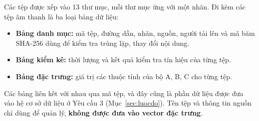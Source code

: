 \documentclass[11pt,a4paper]{article}
\begin{document}
Các tệp được xếp vào 13 thư mục, mỗi thư mục ứng với một nhãn. Đi kèm các tệp âm thanh là ba loại bảng dữ liệu:
\begin{itemize}
\item \textbf{Bảng danh mục:} mã tệp, đường dẫn, nhãn, nguồn, người tải lên và mã băm SHA-256 dùng để kiểm tra trùng lặp, thay đổi nội dung.
\item \textbf{Bảng kiểm kê:} thời lượng và kết quả kiểm tra tín hiệu của từng tệp.
\item \textbf{Bảng đặc trưng:} giá trị các thuộc tính của bộ A, B, C cho từng tệp.
\end{itemize}
Các bảng liên kết với nhau qua mã tệp, và đây cũng là phần dữ liệu được đưa vào hệ cơ sở dữ liệu ở Yêu cầu 3 (Mục~\ref{sec:luocdo}). Tên tệp và thông tin nguồn chỉ dùng để quản lý, \textbf{không được đưa vào vector đặc trưng}.
\end{document}
